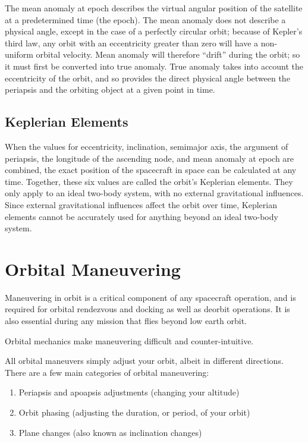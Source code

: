 \documentclass[oneside,a5paper]{book}
\newcommand{\afterchapter}{\vspace{1em}}
\begin{document}
The mean anomaly at epoch describes the virtual angular position of
the satellite at a predetermined time (the epoch). The mean anomaly
does not describe a physical angle, except in the case of a perfectly
circular orbit; because of Kepler’s third law, any orbit with an
eccentricity greater than zero will have a non-uniform orbital
velocity. Mean anomaly will therefore ``drift'' during the orbit; so
it must first be converted into true anomaly. True anomaly takes into
account the eccentricity of the orbit, and so provides the direct
physical angle between the periapsis and the orbiting object at a
given point in time.

\subsection{Keplerian Elements}

When the values for eccentricity, inclination, semimajor axis, the
argument of periapsis, the longitude of the ascending node, and mean
anomaly at epoch are combined, the exact position of the spacecraft in
space can be calculated at any time. Together, these six values are
called the orbit’s Keplerian elements. They only apply to an ideal
two-body system, with no external gravitational influences. Since
external gravitational influences affect the orbit over time,
Keplerian elements cannot be accurately used for anything beyond an
ideal two-body system.

\section{Orbital Maneuvering}

\afterchapter

Maneuvering in orbit is a critical component of any spacecraft
operation, and is required for orbital rendezvous and docking as well
as deorbit operations. It is also essential during any mission that
flies beyond low earth orbit.

Orbital mechanics make maneuvering difficult and counter-intuitive.

All orbital maneuvers simply adjust your orbit, albeit in different
directions. There are a few main categories of orbital maneuvering:

\vspace{2em}

\begin{enumerate}
\item Periapsis and apoapsis adjustments (changing your altitude)
\item Orbit phasing (adjusting the duration, or period, of your orbit)
\item Plane changes (also known as inclination changes)
\end{enumerate}
\end{document}
